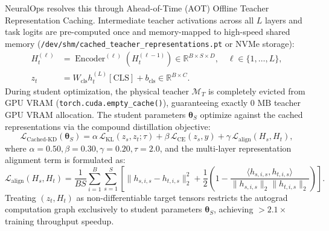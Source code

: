\documentclass{article}
\begin{document}
NeuralOps resolves this through Ahead-of-Time (AOT) Offline Teacher Representation Caching. Intermediate teacher activations across all $L$ layers and task logits are pre-computed once and memory-mapped to high-speed shared memory (\texttt{/dev/shm/cached\_teacher\_representations.pt} or NVMe storage):
\begin{align}
    H_t^{(\ell)} &= \operatorname{Encoder}^{(\ell)}\left(H_t^{(\ell-1)}\right) \in \mathbb{R}^{B \times S \times D}, \quad \ell \in \{1, \dots, L\}, \\
    z_t &= W_{\text{cls}} h_t^{(L)}[\text{CLS}] + b_{\text{cls}} \in \mathbb{R}^{B \times C}.
\end{align}
During student optimization, the physical teacher $\mathcal{M}_T$ is completely evicted from GPU VRAM (\texttt{torch.cuda.empty\_cache()}), guaranteeing exactly $0\text{ MB}$ teacher GPU VRAM allocation. The student parameters $\boldsymbol{\theta}_S$ optimize against the cached representations via the compound distillation objective:
\begin{equation}
    \mathcal{L}_{\text{Cached-KD}}(\boldsymbol{\theta}_S) = \alpha \, \mathcal{L}_{\text{KL}}(z_s, z_t; \tau) + \beta \, \mathcal{L}_{\text{CE}}(z_s, y) + \gamma \, \mathcal{L}_{\text{align}}(H_s, H_t),
\end{equation}
where $\alpha=0.50, \beta=0.30, \gamma=0.20, \tau=2.0$, and the multi-layer representation alignment term is formulated as:
\begin{equation}
    \mathcal{L}_{\text{align}}(H_s, H_t) = \frac{1}{B S} \sum_{i=1}^B \sum_{s=1}^S \left[ \|h_{s, i, s} - h_{t, i, s}\|_2^2 + \frac{1}{2} \left(1 - \frac{\langle h_{s, i, s}, h_{t, i, s} \rangle}{\|h_{s, i, s}\|_2 \|h_{t, i, s}\|_2}\right) \right].
\end{equation}
Treating $(z_t, H_t)$ as non-differentiable target tensors restricts the autograd computation graph exclusively to student parameters $\boldsymbol{\theta}_S$, achieving $>2.1\times$ training throughput speedup.
\end{document}
